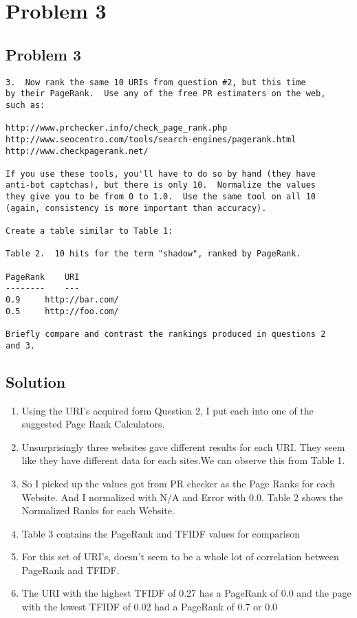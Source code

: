 \section{Problem 3}
\label{part3}
\subsection{Problem 3}
\begin{verbatim}
3.  Now rank the same 10 URIs from question #2, but this time 
by their PageRank.  Use any of the free PR estimaters on the web,
such as:

http://www.prchecker.info/check_page_rank.php
http://www.seocentro.com/tools/search-engines/pagerank.html
http://www.checkpagerank.net/

If you use these tools, you'll have to do so by hand (they have
anti-bot captchas), but there is only 10.  Normalize the values
they give you to be from 0 to 1.0.  Use the same tool on all 10
(again, consistency is more important than accuracy).

Create a table similar to Table 1:

Table 2.  10 hits for the term "shadow", ranked by PageRank.

PageRank	URI
--------	---
0.9		http://bar.com/
0.5		http://foo.com/

Briefly compare and contrast the rankings produced in questions 2
and 3.
\end{verbatim}
\newpage
\subsection{Solution}
\begin{enumerate}
\item Using the URI's acquired form Question 2, I put each into one of the suggested Page Rank Calculators. 
\item Unsurprisingly three websites gave different results for each URI. They seem like they have different data for each sites.We can observe this from Table 1.   
\item So I picked up the values got from PR checker as the Page Ranks for each Website. And I normalized with N/A and Error with 0.0. Table 2 shows the Normalized Ranks for each Website.  
\item Table 3 contains the PageRank and TFIDF values for comparison
\item For this set of URI's, doesn't seem to be a whole lot of correlation between PageRank and TFIDF. 
\item The URI with the highest TFIDF of 0.27 has a PageRank of 0.0 and the page with the lowest TFIDF of 0.02 had a PageRank of 0.7 or 0.0

\end{enumerate}

